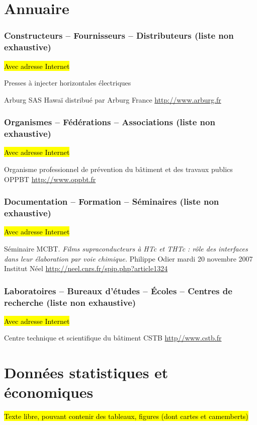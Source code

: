 \documentclass[a4paper,12pt]{article}
\begin{document}
\section*{Annuaire}
\subsubsection*{Constructeurs -- Fournisseurs -- Distributeurs (liste non exhaustive)}
\hl{Avec adresse Internet}

Presses \`a injecter horizontales \'electriques

Arburg SAS Hawa\"i distribu\'e par Arburg France \url{http://www.arburg.fr}

\subsubsection*{Organismes -- F\'ed\'erations -- Associations (liste non exhaustive)}
\hl{Avec adresse Internet}

Organisme professionnel de pr\'evention du b\^atiment et des travaux publics OPPBT \url{http://www.oppbt.fr}


\subsubsection*{Documentation -- Formation -- S\'eminaires (liste non exhaustive)}
\hl{Avec adresse Internet}

S\'eminaire MCBT. \textit{Films supraconducteurs \`a HTc et THTc : r\^ole des interfaces dans leur \'elaboration par voie chimique.} Philippe Odier mardi 20 novembre 2007 Institut N\'eel \url{http://neel.cnrs.fr/spip.php?article1324}

\subsubsection*{Laboratoires -- Bureaux d'\'etudes -- \'Ecoles -- Centres de recherche  (liste non exhaustive)}
\hl{Avec adresse Internet}

Centre technique et scientifique du b\^atiment CSTB \url{http//www.cstb.fr}

\section*{Donn\'ees statistiques et \'economiques}
\hl{Texte libre, pouvant contenir des tableaux, figures (dont cartes et camemberts)}




\label{LastPage}
\end{document}
